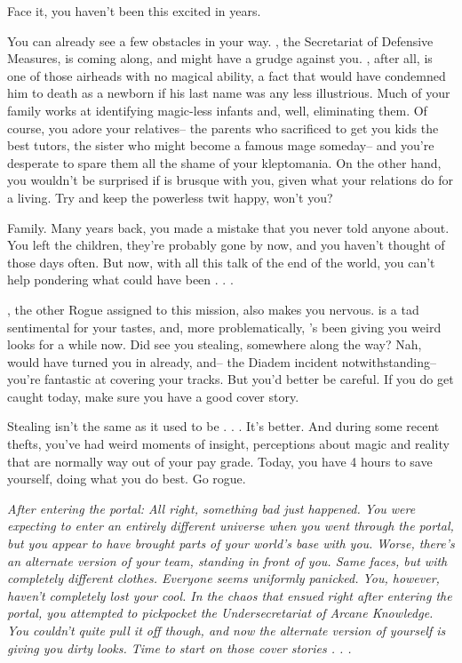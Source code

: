 \documentclass[char]{guildcamp3}
\begin{document}
Face it, you haven't been this excited in years.

You can already see a few obstacles in your way. \cNobleOne{}, the Secretariat of Defensive Measures, is coming along, and \cNobleOne{\they} might have a grudge against you.  \cNobleOne{\they}, after all, is one of those airheads with no magical ability, a fact that would have condemned him to death as a newborn if his last name was any less illustrious. Much of your family works at identifying magic-less infants and, well, eliminating them. Of course, you adore your relatives-- the parents who sacrificed to get you kids the best tutors, the sister who might become a famous mage someday-- and you're desperate to spare them all the shame of your kleptomania. On the other hand, you wouldn't be surprised if \cNobleOne{} is brusque with you, given what your relations do for a living. Try and keep the powerless twit happy, won't you? 

Family. Many years back, you made a mistake that you never told anyone about. You left the children, they're probably gone by now, and you haven't thought of those days often. But now, with all this talk of the end of the world, you can't help pondering what could have been . . .

\cRogueOne{}, the other Rogue assigned to this mission, also makes you nervous. \cRogueOne{\they} is a tad sentimental for your tastes, and, more problematically, \cRogueOne{\they}'s been giving you weird looks for a while now. Did \cRogueOne{\they} see you stealing, somewhere along the way? Nah, \cRogueOne{\they} would have turned you in already, and-- the Diadem incident notwithstanding-- you're fantastic at covering your tracks. But you'd better be careful. If you do get caught today, make sure you have a good cover story.

Stealing isn't the same as it used to be . . . It's better. And during some recent thefts, you've had weird moments of insight, perceptions about magic and reality that are normally way out of your pay grade.  Today, you have 4 hours to save yourself, doing what you do best. Go rogue.

\em{After entering the portal:}
All right, something bad just happened. You were expecting to enter an entirely different universe when you went through the portal, but you appear to have brought parts of your world's base with you. Worse, there's an alternate version of your team, standing in front of you. Same faces, but with completely different clothes. Everyone seems uniformly panicked.
You, however, haven't completely lost your cool. In the chaos that ensued right after entering the portal, you attempted to pickpocket the Undersecretariat of Arcane Knowledge. You couldn't quite pull it off though, and now the alternate version of yourself is giving you dirty looks. Time to start on those cover stories . . .
\end{document}
